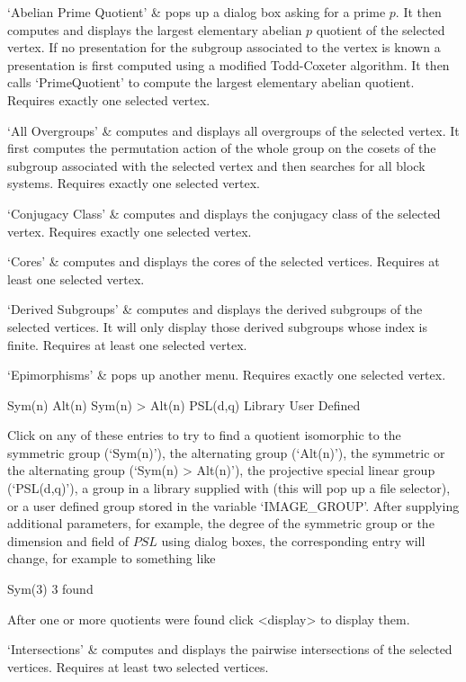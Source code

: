 \beginitems
`Abelian Prime Quotient' &
pops  up a dialog  box asking  for a  prime  $p$.  It  then computes  and
displays the largest elementary   abelian  $p$ quotient of  the  selected
vertex.  If no presentation for the  subgroup associated to the vertex is
known   a presentation is  first computed  using  a modified Todd-Coxeter
algorithm.     It then calls    `PrimeQuotient' to   compute  the largest
elementary abelian quotient.  Requires exactly one selected vertex.

`All Overgroups' &
computes and displays all overgroups  of the selected vertex.  It  first
computes the permutation action of the whole  group on the cosets of the
subgroup associated with  the selected vertex and  then searches  for all
block systems.  Requires exactly one selected vertex.

`Conjugacy Class' &
computes and  displays  the   conjugacy  class of  the   selected vertex.
Requires  exactly  one selected vertex.  

`Cores' &
computes and  displays the cores  of the selected vertices.   Requires at
least one selected vertex.

`Derived Subgroups' &
computes and displays the derived subgroups of the selected vertices.  It
will  only  display  those derived    subgroups  whose index is   finite.
Requires at least one selected vertex.

`Epimorphisms' &
pops up another menu. Requires exactly one selected vertex.

\begintt
Sym(n)
Alt(n)
Sym(n) > Alt(n)
PSL(d,q)
Library
User Defined 
\endtt

Click on any of these entries to try to find a quotient isomorphic to the
symmetric group (`Sym(n)'), the alternating group (`Alt(n)'),
the symmetric or the alternating group (`Sym(n) > Alt(n)'), the projective
special linear group (`PSL(d,q)'), a group in a library supplied with
{\XGAP} (this will pop up a file selector), or a user defined group stored
in the variable `IMAGE_GROUP'.  After supplying additional parameters, for
example, the degree of the symmetric group or the dimension and field of
$PSL$ using dialog boxes, the corresponding entry will change, for example
to something like

\begintt
Sym(3)        3 found
\endtt

After one or more quotients were found click <display> to display them.

`Intersections' &
computes and   displays   the pairwise   intersections  of  the  selected
vertices.  Requires at least two selected vertices.

